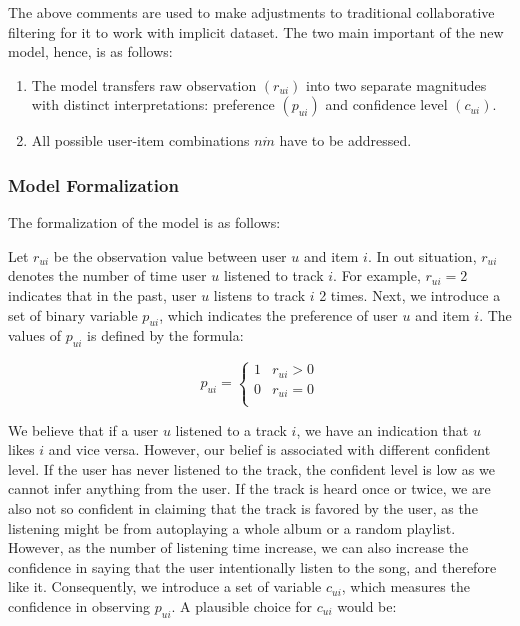 The above comments are used to make adjustments to traditional collaborative filtering for it to work with implicit dataset. The two main important of the new model, hence, is as follows:

\begin{enumerate}
	\item The model transfers raw observation \((r_{ui})\) into two separate magnitudes with distinct interpretations: preference \((p_{ui})\) and confidence level \((c_{ui})\). 
	\item All possible user-item combinations \( n \dot m\) have to be addressed. 
\end{enumerate}

\subsubsection{Model Formalization}
The formalization of the model is as follows: 

Let \(r_{ui}\) be the observation value between user \(u\) and item \(i\). In out situation, \(r_{ui}\) denotes the number of time user \(u\) listened to track \(i\). For example, \(r_{ui} = 2\) indicates that in the past, user \(u\) listens to track \(i\) 2 times. Next, we introduce a set of binary variable \(p_{ui}\), which indicates the preference of user \(u\) and item \(i\). The values of \(p_{ui}\) is defined by the formula: 

\begin{displaymath}
p_{ui} = \left\{ \begin{array}{lc} 
1 &  r_{ui} > 0\\
0 & r_{ui} = 0\\
\end{array}
\right. 
\end{displaymath}

We believe that if a user \(u\) listened to a track \(i\), we have an indication that \(u\) likes \(i\) and vice versa. However, our belief is associated with different confident level. If the user has never listened to the track, the confident level is low as we cannot infer anything from the user. If the track is heard once or twice, we are also not so confident in claiming that the track is favored by the user, as the listening might be from autoplaying a whole album or a random playlist. However, as the number of listening time increase, we can also increase the confidence in saying that the user intentionally listen to the song, and therefore like it. Consequently, we introduce a set of variable \(c_{ui}\), which measures the confidence in observing \(p_{ui}\). A plausible choice for \(c_{ui}\) would be:


